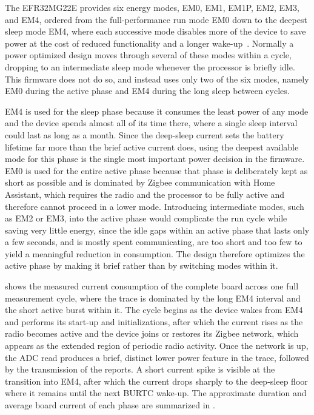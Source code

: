 The EFR32MG22E provides six energy modes, EM0, EM1, EM1P, EM2, EM3, and EM4, ordered from the full-performance run mode EM0 down to the deepest sleep mode EM4, where each successive mode disables more of the device to save power at the cost of reduced functionality and a longer wake-up~\cite{silabs_efr32xg22_reference, silabs_efr32xg22_wireless}.
Normally a power optimized design moves through several of these modes within a cycle, dropping to an intermediate sleep mode whenever the processor is briefly idle.
This firmware does not do so, and instead uses only two of the six modes, namely EM0 during the active phase and EM4 during the long sleep between cycles.

EM4 is used for the sleep phase because it consumes the least power of any mode and the device spends almost all of its time there, where a single sleep interval could last as long as a month.
Since the deep-sleep current sets the battery lifetime far more than the brief active current does, using the deepest available mode for this phase is the single most important power decision in the firmware.
EM0 is used for the entire active phase because that phase is deliberately kept as short as possible and is dominated by Zigbee communication with Home Assistant, which requires the radio and the processor to be fully active and therefore cannot proceed in a lower mode.
Introducing intermediate modes, such as EM2 or EM3, into the active phase would complicate the run cycle while saving very little energy, since the idle gaps within an active phase that lasts only a few seconds, and is mostly spent communicating, are too short and too few to yield a meaningful reduction in consumption.
The design therefore optimizes the active phase by making it brief rather than by switching modes within it.

 shows the measured current consumption of the complete board across one full measurement cycle, where the trace is dominated by the long EM4 interval and the short active burst within it. The cycle begins as the device wakes from EM4 and performs its start-up and initializations, after which the current rises as the radio becomes active and the device joins or restores its Zigbee network, which appears as the extended region of periodic radio activity. Once the network is up, the ADC read produces a brief, distinct lower power feature in the trace, followed by the transmission of the reports. A short current spike is visible at the transition into EM4, after which the current drops sharply to the deep-sleep floor where it remains until the next BURTC wake-up. The approximate duration and average board current of each phase are summarized in .

